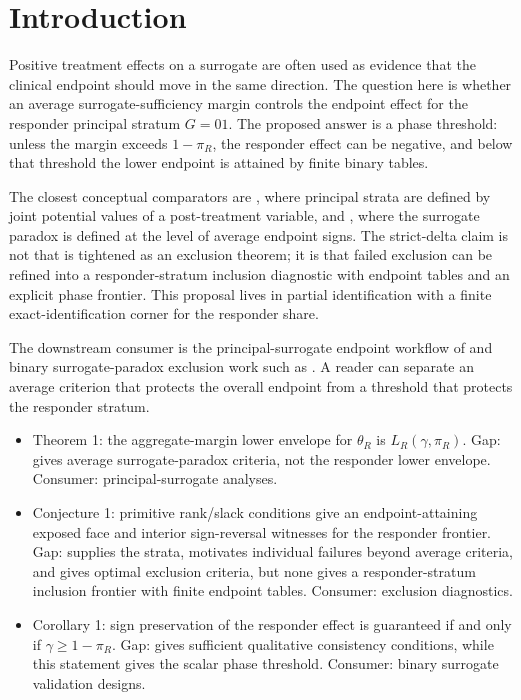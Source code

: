 \documentclass[11pt]{article}
\theoremstyle{definition}
\theoremstyle{plain}
\theoremstyle{remark}
\begin{document}
\section{Introduction}
Positive treatment effects on a surrogate are often used as evidence that the clinical endpoint should move in the same direction.  The question here is whether an average surrogate-sufficiency margin controls the endpoint effect for the responder principal stratum \(G=01\).  The proposed answer is a phase threshold: unless the margin exceeds \(1-\pi_R\), the responder effect can be negative, and below that threshold the lower endpoint is attained by finite binary tables.

The closest conceptual comparators are \citet[p.~24, Definition 1]{FrangakisRubin2002}, where principal strata are defined by joint potential values of a post-treatment variable, and \citet[p.~919, Summary]{ChenGengJia2007}, where the surrogate paradox is defined at the level of average endpoint signs.  The strict-delta claim is not that \citet{YinLiuGengLuo2020} is tightened as an exclusion theorem; it is that failed exclusion can be refined into a responder-stratum inclusion diagnostic with endpoint tables and an explicit phase frontier.  This proposal lives in partial identification with a finite exact-identification corner for the responder share.

The downstream consumer is the principal-surrogate endpoint workflow of \citet{GilbertHudgens2008} and binary surrogate-paradox exclusion work such as \citet{YinLiuGengLuo2020}.  A reader can separate an average criterion that protects the overall endpoint from a threshold that protects the responder stratum.

\begin{itemize}[leftmargin=*]
\item Theorem 1: the aggregate-margin lower envelope for \(\theta_R\) is \(L_R(\gamma,\pi_R)\). Gap: \citet{ChenGengJia2007} gives average surrogate-paradox criteria, not the responder lower envelope. Consumer: \citet{GilbertHudgens2008} principal-surrogate analyses.
\item Conjecture 1: primitive rank/slack conditions give an endpoint-attaining exposed face and interior sign-reversal witnesses for the responder frontier. Gap: \citet[p.~24, Definition 1]{FrangakisRubin2002} supplies the strata, \citet[p.~97, abstract; p.~99, Section 2]{MaYinLiuGeng2021} motivates individual failures beyond average criteria, and \citet[pp.~84--85, Introduction; p.~88, Theorem 1]{YinLiuGengLuo2020} gives optimal exclusion criteria, but none gives a responder-stratum inclusion frontier with finite endpoint tables. Consumer: \citet{YinLiuGengLuo2020} exclusion diagnostics.
\item Corollary 1: sign preservation of the responder effect is guaranteed if and only if \(\gamma\ge 1-\pi_R\). Gap: \citet{VanderWeele2013} gives sufficient qualitative consistency conditions, while this statement gives the scalar phase threshold. Consumer: binary surrogate validation designs.
\end{itemize}
\end{document}
